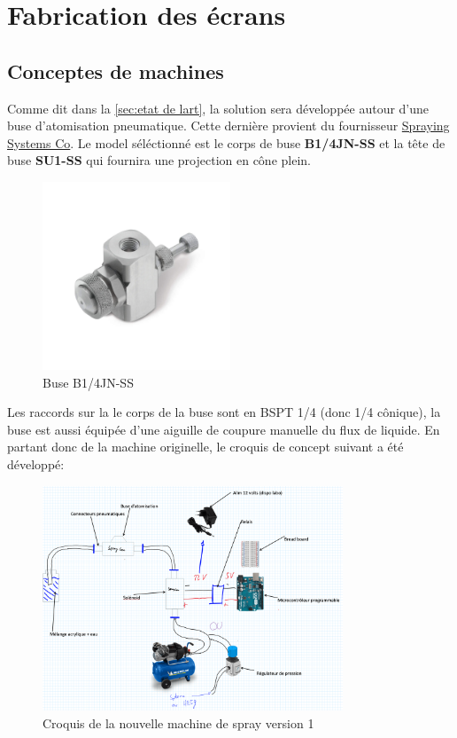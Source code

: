 \section{Fabrication des écrans}

\subsection{Conceptes de machines}
Comme dit dans la \autoref{sec:etat de lart}, la solution sera développée autour d'une buse d'atomisation pneumatique.
Cette dernière provient du fournisseur \href{https://www.spray.com/fr-eu}{Spraying Systems Co}\footnotemark.
Le model séléctionné est le corps de buse \textbf{B1/4JN-SS} et la tête de buse \textbf{SU1-SS } qui fournira une projection en cône plein.
\begin{figure}[H]
    \centering
    \includegraphics[width = 0.5\textwidth]{assets/figures/ameliorations/J_Series_1_8JN_and_1_4JN.jpeg}
    \caption[Buse B1/4JN-SS]{Buse B1/4JN-SS \cite{image_buse_spray_com}}
\end{figure}
Les raccords sur la le corps de la buse sont en BSPT 1/4 (donc 1/4 cônique), la buse est aussi équipée d'une aiguille de coupure manuelle du flux de liquide.
En partant donc de la machine originelle, le croquis de concept suivant a été développé:
\begin{figure}[H]
    \centering
    \includegraphics[width = 0.8\textwidth]{assets/figures/ameliorations/Croquis_machine_ecran_ver_1.png}
    \caption[Croquis nouvelle machine de spray ver. 1]{Croquis de la nouvelle machine de spray version 1}
\end{figure}

